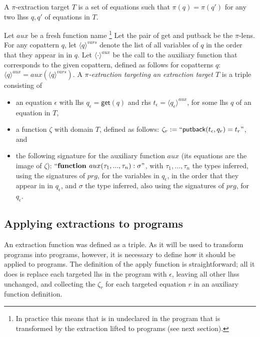 \begin{definition}
A $\pi$-extraction target $T$ is a set of equations such that $\pi(q) = \pi(q')$ for any two lhss $q, q'$ of equations in $T$.
\end{definition}

\begin{definition}
Let $aux$ be a fresh function name \footnote{In practice this means that is in undeclared in the program that is transformed by the extraction lifted to programs (see next section).} Let the pair of \textsf{get} and \textsf{putback} be the $\pi$-lens. For any copattern $q$, let $\langle q \rangle^{vars}$ denote the list of all variables of $q$ in the order that they appear in in $q$. Let $\langle \cdot \rangle^{aux}$ be the call to the auxiliary function that corresponds to the given copattern, defined as follows for copatterns $q$: $\langle q \rangle^{aux} = aux(\langle q \rangle^{vars})$. A \textit{$\pi$-extraction targeting an extraction target $T$} is a triple consisting of
\begin{itemize}
\item an equation $\epsilon$ with lhs $q_\epsilon = \textsf{get}(q)$ and rhs $t_\epsilon = \langle q_\epsilon \rangle^{aux}$, for some lhs $q$ of an equation in $T$,
\item a function $\zeta$ with domain $T$, defined as follows: $\zeta_r := ``\textsf{putback}(t_\epsilon, q_r) = t_r  "$, and
\item the following signature for the auxiliary function $aux$ (its equations are the image of $\zeta$): $`` \textrm{\textbf{function }} aux(\tau_1, ..., \tau_n): \sigma "$, with $\tau_1, ..., \tau_n$ the types inferred, using the signatures of $prg$, for the variables in $q_\epsilon$, in the order that they appear in in $q_\epsilon$, and $\sigma$ the type inferred, also using the signatures of $prg$, for $q_\epsilon$.
\end{itemize}
\end{definition}

\subsection{Applying extractions to programs}

An extraction function was defined as a triple. As it will be used to transform programs into programs, however, it is necessary to define how it should be applied to programs. The definition of the apply function is straightforward; all it does is replace each targeted lhs in the program with $\epsilon$, leaving all other lhss unchanged, and collecting the $\zeta_r$ for each targeted equation $r$ in an auxiliary function definition.

